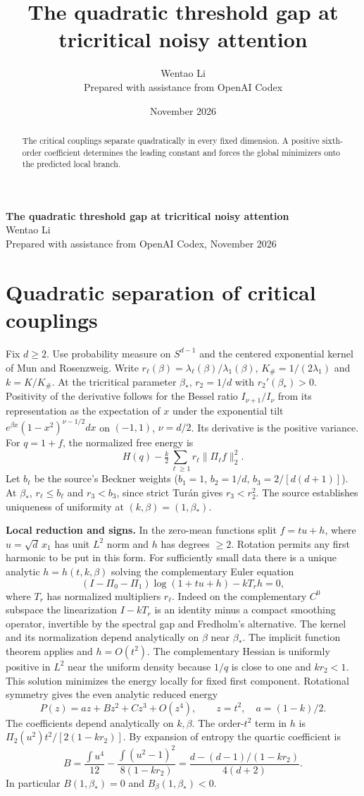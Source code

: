 \documentclass[10pt]{article}
\title{The quadratic threshold gap at tricritical noisy attention}
\author{Wentao Li\\{\small Prepared with assistance from OpenAI Codex}}
\date{November 2026}
\begin{document}
\begin{center}{\Large\bfseries The quadratic threshold gap at tricritical noisy attention}\\[3pt]Wentao Li\\{\small Prepared with assistance from OpenAI Codex, November 2026}\end{center}
\begin{abstract}
The critical couplings separate quadratically in every fixed dimension. A positive sixth-order coefficient determines the leading constant and forces the global minimizers onto the predicted local branch.
\end{abstract}
\section*{Quadratic separation of critical couplings}
Fix $d\ge2$. Use probability measure on $S^{d-1}$ and the centered exponential kernel of Mun and Rosenzweig. Write $r_\ell(\beta)=\lambda_\ell(\beta)/\lambda_1(\beta)$, $K_\#=1/(2\lambda_1)$ and $k=K/K_\#$. At the tricritical parameter $\beta_*$, $r_2=1/d$ with $r_2'(\beta_*)>0$. Positivity of the derivative follows for the Bessel ratio $I_{\nu+1}/I_\nu$ from its representation as the expectation of $x$ under the exponential tilt $e^{\beta x}(1-x^2)^{\nu-1/2}dx$ on $(-1,1)$, $\nu=d/2$. Its derivative is the positive variance. For $q=1+f$, the normalized free energy is
\[
 H(q)-\tfrac k2\sum_{\ell\ge1}r_\ell\|\Pi_\ell f\|_2^2 .
\]
Let $b_\ell$ be the source's Beckner weights ($b_1=1$, $b_2=1/d$, $b_3=2/[d(d+1)]$). At $\beta_*$, $r_\ell\le b_\ell$ and $r_3<b_3$, since strict Turán gives $r_3<r_2^2$. The source establishes uniqueness of uniformity at $(k,\beta)=(1,\beta_*)$.

\textbf{Local reduction and signs.} In the zero-mean functions split $f=t u+h$, where $u=\sqrt d\,x_1$ has unit $L^2$ norm and $h$ has degrees $\ge2$. Rotation permits any first harmonic to be put in this form. For sufficiently small data there is a unique analytic $h=h(t,k,\beta)$ solving the complementary Euler equation
\[
 (I-\Pi_0-\Pi_1)\log(1+t u+h)-kT_r h=0,
\]
where $T_r$ has normalized multipliers $r_\ell$. Indeed on the complementary $C^0$ subspace the linearization $I-kT_r$ is an identity minus a compact smoothing operator, invertible by the spectral gap and Fredholm's alternative. The kernel and its normalization depend analytically on $\beta$ near $\beta_*$. The implicit function theorem applies and $h=O(t^2)$. The complementary Hessian is uniformly positive in $L^2$ near the uniform density because $1/q$ is close to one and $kr_2<1$. This solution minimizes the energy locally for fixed first component. Rotational symmetry gives the even analytic reduced energy
\[
 P(z)=a z+Bz^2+Cz^3+O(z^4),\qquad z=t^2,\quad a=(1-k)/2 .
\]
The coefficients depend analytically on $k,\beta$. The order-$t^2$ term in $h$ is $\Pi_2(u^2)t^2/[2(1-kr_2)]$. By expansion of entropy the quartic coefficient is
\[
 B=\frac{\int u^4}{12}-\frac{\int(u^2-1)^2}{8(1-kr_2)}
 =\frac{d-(d-1)/(1-kr_2)}{4(d+2)} .
\]
In particular $B(1,\beta_*)=0$ and $B_\beta(1,\beta_*)<0$.
\end{document}
